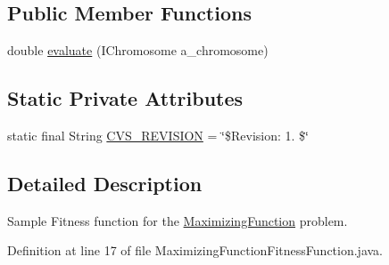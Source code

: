 \subsection*{Public Member Functions}
\begin{DoxyCompactItemize}
\item 
double \hyperlink{classexamples_1_1config_1_1_maximizing_function_fitness_function_a9645522a95453a5c6fdbcd4a5b00f258}{evaluate} (I\-Chromosome a\-\_\-chromosome)
\end{DoxyCompactItemize}
\subsection*{Static Private Attributes}
\begin{DoxyCompactItemize}
\item 
static final String \hyperlink{classexamples_1_1config_1_1_maximizing_function_fitness_function_a655cf371ef85ddd61b8c59272564fbe3}{C\-V\-S\-\_\-\-R\-E\-V\-I\-S\-I\-O\-N} = \char`\"{}\$Revision\-: 1. \$\char`\"{}
\end{DoxyCompactItemize}


\subsection{Detailed Description}
Sample Fitness function for the \hyperlink{classexamples_1_1config_1_1_maximizing_function}{Maximizing\-Function} problem. 

Definition at line 17 of file Maximizing\-Function\-Fitness\-Function.\-java.



